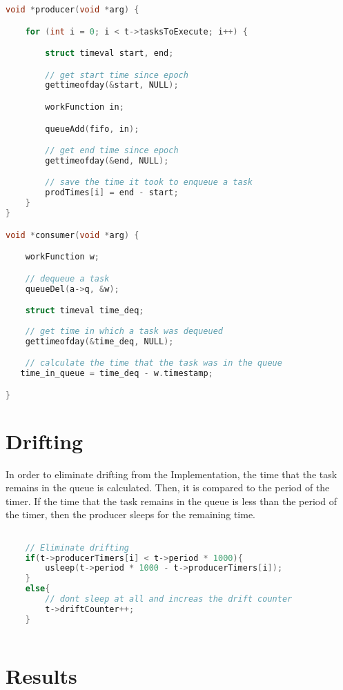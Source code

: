 \documentclass[12pt, a4paper]{report}
\begin{document}
\begin{lstlisting}[language=C]
void *producer(void *arg) {

    for (int i = 0; i < t->tasksToExecute; i++) {

        struct timeval start, end;

        // get start time since epoch
        gettimeofday(&start, NULL);

        workFunction in;

        queueAdd(fifo, in);

        // get end time since epoch
        gettimeofday(&end, NULL);

        // save the time it took to enqueue a task
        prodTimes[i] = end - start;
    }
}

void *consumer(void *arg) {

    workFunction w;

    // dequeue a task
    queueDel(a->q, &w);

    struct timeval time_deq;
    
    // get time in which a task was dequeued
    gettimeofday(&time_deq, NULL);

    // calculate the time that the task was in the queue
   time_in_queue = time_deq - w.timestamp;

}
\end{lstlisting}

\section*{Drifting}
In order to eliminate drifting from the Implementation, the time that the task remains in the queue is
calculated. Then, it is compared to the period of the timer. If the time that the 
task remains in the queue is less than the period of the timer, then the producer sleeps for the remaining
time.

\begin{lstlisting}[language=C]

    // Eliminate drifting
    if(t->producerTimers[i] < t->period * 1000){
        usleep(t->period * 1000 - t->producerTimers[i]);
    }
    else{
        // dont sleep at all and increas the drift counter
        t->driftCounter++;
    }
    
\end{lstlisting}

\newpage
\section*{Results}
\end{document}
